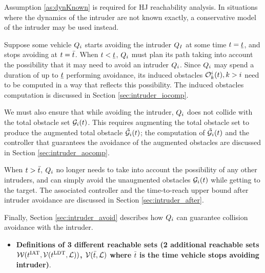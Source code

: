 Assumption \ref{as:dynKnown} is required for HJ reachability analysis. In situations where the dynamics of the intruder are not known exactly, a conservative model of the intruder may be used instead.

Suppose some vehicle $Q_{i}$ starts avoiding the intruder $Q_{I}$ at some time $t = \underline{t}$, and stops avoiding at $t = \bar{t}$. When $t < \underline{t}$, $Q_{i}$ must plan its path taking into account the possibility that it may need to avoid an intruder $Q_{i}$. Since $Q_{i}$ may spend a duration of up to $\underline{t}$ performing avoidance, its induced obstacles $\mathcal{O}_k^i(t), k>i$ need to be computed in a way that reflects this possibility. The induced obstacles computation is discussed in Section \ref{sec:intruder_iocomp}.

We must also ensure that while avoiding the intruder, $Q_{i}$ does not collide with the total obstacle set $\mathcal{G}_i(t)$. This requires augmenting the total obstacle set to produce the augmented total obstacle $\tilde{\mathcal{G}}_i(t)$; the computation of $\tilde{\mathcal{G}}_i(t)$ and the controller that guarantees the avoidance of the augmented obstacles are discussed in Section \ref{sec:intruder_aocomp}.

When $t > \bar{t}$, $Q_{i}$ no longer needs to take into account the possibility of any other intruders, and can simply avoid the unaugmented obstacles $\mathcal{G}_i(t)$ while getting to the target. The associated controller and the time-to-reach upper bound after intruder avoidance are discussed in Section \ref{sec:intruder_after}.

Finally, Section \ref{sec:intruder_avoid} describes how $Q_{i}$ can guarantee collision avoidance with the intruder.

\begin{itemize}
\item \textbf{Definitions of 3 different reachable sets (2 additional reachable sets $\mathcal{W}(t^\text{IAT}, \mathcal{V}(t^\text{LDT}, \mathcal{L}))$, $\mathcal{V}(\bar t, \mathcal{L})$ where $\bar t$ is the time vehicle stops avoiding intruder)}.
\end{itemize}

